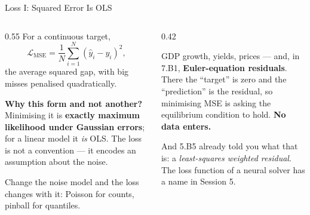 \begin{frame}{Loss I: Squared Error Is OLS}
\begin{columns}[T]
\begin{column}{0.55\textwidth}
\small
For a continuous target,
\[
  \mathcal{L}_{\text{MSE}}=\frac{1}{N}\sum_{i=1}^{N}(\hat y_i-y_i)^{2},
\]
the average squared gap, with big misses penalised quadratically.
\medskip

\textbf{Why this form and not another?} Minimising it is \textbf{exactly maximum likelihood under Gaussian errors}; for a linear model it \emph{is} OLS. The loss is not a convention --- it encodes an assumption about the noise.
\medskip

Change the noise model and the loss changes with it: Poisson for counts, pinball for quantiles.
\end{column}
\begin{column}{0.42\textwidth}
\begin{takeawaybox}[title=\textbf{Where this lands}]\small
GDP growth, yields, prices --- and, in 7.B1, \textbf{Euler-equation residuals}.
\medskip
There the ``target'' is zero and the ``prediction'' is the residual, so minimising MSE is asking the equilibrium condition to hold. \textbf{No data enters.}
\end{takeawaybox}
\medskip
\begin{examplebox}\footnotesize
And 5.B5 already told you what that is: a \emph{least-squares weighted residual}. The loss function of a neural solver has a name in Session 5.
\end{examplebox}
\end{column}
\end{columns}
\end{frame}

